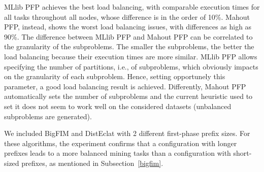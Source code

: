 \documentclass[preprint,review,12pt]{elsarticle}
\begin{document}
MLlib PFP achieves the best load balancing, with comparable
execution times for all tasks throughout all nodes,
whose difference is in the order of 10\%.
Mahout PFP, instead, shows the worst load balancing issues,
with differences as high as 90\%. The difference between MLlib PFP and Mahout PFP can be correlated to the 
granularity of the subproblems. The smaller the subproblems, the better the load balancing
because their execution times are more similar. MLlib PFP allows specifying the number of partitions, i.e., of subproblems, which obviously impacts on the 
granularity of each subproblem. Hence, setting opportunely this parameter, a good load balancing result is achieved. Differently, 
Mahout PFP automatically sets the number of subproblems and the current heuristic used to set it does not seem to work well on the considered datasets
(unbalanced subproblems are generated).

We included BigFIM and DistEclat with 2 different
first-phase prefix sizes.
For these algorithms, the experiment confirms that a configuration with longer prefixes
leads to a more balanced mining tasks than a configuration with short-sized prefixes,
as mentioned in Subsection~\ref{bigfim}.
%



\end{document}
